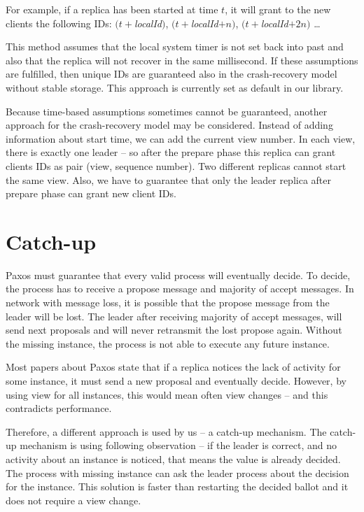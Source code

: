 For example, if a replica has been started at time $t$, it will grant to the new clients the following IDs: $(t + $\textit{localId}$)$, $(t + $\textit{localId}$ + n)$, $(t + $\textit{localId}$ + 2n)$ \ldots

This method assumes that the local system timer is not set back into past and also that the replica will not recover in the same millisecond. If these assumptions are fulfilled, then unique IDs are guaranteed also in the crash-recovery model without stable storage. This approach is currently set as default in our library.

Because time-based assumptions sometimes cannot be guaranteed, another approach for the crash-recovery model may be considered. Instead of adding information about start time, we can add the current view number. In each view, there is exactly one leader -- so after the prepare phase this replica can grant clients IDs as pair (view, sequence number). Two different replicas cannot start the same view.
Also, we have to guarantee that only the leader replica after prepare phase can grant new client IDs.

\section{Catch-up}
\label{sec:catch_up}


Paxos must guarantee that every valid process will eventually decide. To decide, the process has to receive a propose message and majority of accept messages. In network with message loss, it is possible that the propose message from the leader will be lost. The leader after receiving majority of accept messages, will send next proposals and will never retransmit the lost propose again. Without the missing instance, the process is not able to execute any future instance.

Most papers about Paxos state that if a replica notices the lack of activity for some instance, it must send a new proposal and eventually decide. However, by using view for all instances, this would mean often view changes -- and this contradicts performance.

Therefore, a different approach is used by us -- a catch-up mechanism. The catch-up mechanism is using following observation -- if the leader is correct, and no activity about an instance is noticed, that means the value is already decided. The process with missing instance can ask the leader process about the decision for the instance. This solution \linebreak is faster than restarting the decided ballot and it does not require a view change.


